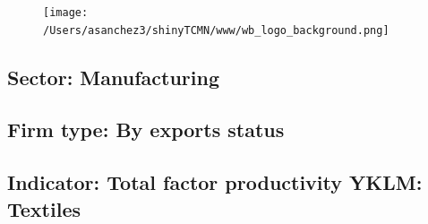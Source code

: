 \documentclass{article}\usepackage[]{graphicx}\usepackage[]{color}
\begin{document}
%

\begin{figure}
  \vspace{-3ex} %
  \hspace{-7ex} %
  \texttt{[image: /Users/asanchez3/shinyTCMN/www/wb\_logo\_background.png]}
\end{figure}
 \begin{minipage}[t]{1.1\textwidth} %
      \vspace{-30ex}
      \hspace{10ex}
  \end{minipage}
  
%
\begin{minipage}[t]{0.99\textwidth} %
  \vspace{-0.5cm}
      \subsection*{\color{white!40!black}Sector: \color{blue!40!black}Manufacturing}
      \subsection*{\color{white!40!black}Firm type: \color{blue!40!black}By exports status}
      \subsection*{\color{white!40!black}Indicator: \color{blue!40!black}Total factor productivity YKLM: Textiles}
  \end{minipage} %
\end{document}

